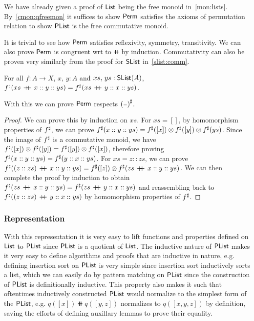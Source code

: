 We have already given a proof of $\operatorname{\mathsf{List}}$ being the free monoid in~\cref{mon:lists}.
By~\cref{cmon:qfreemon} it suffices to show $\operatorname{\mathsf{Perm}}$ satisfies the axioms of permutation relation
to show $\operatorname{\mathsf{PList}}$ is the free commutative monoid.

It is trivial to see how $\operatorname{\mathsf{Perm}}$ satisfies reflexivity, symmetry, transitivity.
We can also prove $\operatorname{\mathsf{Perm}}$ is congruent wrt to $\doubleplus$ by induction.
Commutativity can also be proven very similarly from the proof for $\operatorname{\mathsf{SList}}$ in~\cref{slist:comm}.

\begin{theorem}\label{plist:sharp-sat}
    For all $f : A \to X$, $x, \, y : A$ and $xs, \, ys : \operatorname{\mathsf{SList}}(A)$,
    ${f}^{\sharp}(xs\,\mathbin{+\kern -0.4em+}\,x :: y :: ys) = {f}^{\sharp}(xs\,\mathbin{+\kern -0.4em+}\,y :: x :: ys)$.
\end{theorem}

With this we can prove $\operatorname{\mathsf{Perm}}$ respects ${({\scriptstyle{-}})}^{\sharp}$.

\begin{proof}
We can prove this by induction on $xs$. For $xs = []$, by homomorphism properties of ${f}^{\sharp}$,
we can prove ${f}^{\sharp}(x :: y :: ys) = {f}^{\sharp}([ x ]) \otimes {f}^{\sharp}([ y ]) \otimes {f}^{\sharp}(ys)$.
Since the image of ${f}^{\sharp}$ is a commutative monoid, we have
${f}^{\sharp}([ x ]) \otimes {f}^{\sharp}([ y ]) = {f}^{\sharp}([ y ]) \otimes {f}^{\sharp}([ x ])$, therefore proving
${f}^{\sharp}(x :: y :: ys) = {f}^{\sharp}(y :: x :: ys)$. For $xs = z :: zs$, we can prove
${f}^{\sharp}((z :: zs)\,\mathbin{+\kern -0.4em+}\,x :: y :: ys) = {f}^{\sharp}([ z ]) \otimes {f}^{\sharp}(zs\,\mathbin{+\kern -0.4em+}\,x :: y :: ys)$.
We can then complete the proof by induction to obtain
${f}^{\sharp}(zs\,\mathbin{+\kern -0.4em+}\,x :: y :: ys) = {f}^{\sharp}(zs\,\mathbin{+\kern -0.4em+}\,y :: x :: ys)$ and reassembling
back to ${f}^{\sharp}((z :: zs)\,\mathbin{+\kern -0.4em+}\,y :: x :: ys)$ by homomorphism properties of ${f}^{\sharp}$.
\end{proof}

\subsubsection{Representation}\label{plist:rep}
With this representation it is very easy to lift functions and properties defined on $\operatorname{\mathsf{List}}$
to $\operatorname{\mathsf{PList}}$ since $\operatorname{\mathsf{PList}}$ is a quotient of $\operatorname{\mathsf{List}}$. The inductive nature of $\operatorname{\mathsf{PList}}$ makes it
very easy to define algorithms and proofs that are inductive in nature, e.g. defining insertion sort
on $\operatorname{\mathsf{PList}}$ is very simple since insertion sort inductively sorts a list, which we can easily do by
pattern matching on $\operatorname{\mathsf{PList}}$ since the construction of $\operatorname{\mathsf{PList}}$ is definitionally inductive.
This property also makes it such that oftentimes inductively constructed $\operatorname{\mathsf{PList}}$ would normalize to the
simplest form of the $\operatorname{\mathsf{PList}}$, e.g. $q([ x ]) \doubleplus q([y, z])$ normalizes to $q([x,y,z])$ by
definition, saving the efforts of defining auxillary lemmas to prove their equality.

